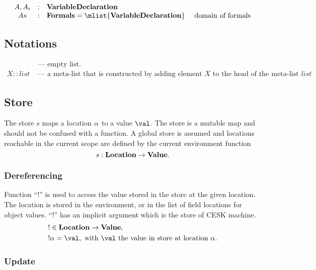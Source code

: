 \documentclass[a4paper,oneside]{article}
\begin{document}
\[
  \begin{array}{ccll}
    \formal, \formali{i} & : & \dvardecl\\
    \formals & : & \dformals = \mlist{\dvardecl} &\text{ domain of formals}\\

  \end{array}
\]


\subsection{Notations}
\label{subsec:notations}

\begin{align*}
    [] &\text{ --- empty list}.\\
    X :: list &\text{ --- a meta-list that is constructed by adding element $X$ to the head of the meta-list $list$}.
\end{align*}


\subsection{Store}
\label{subsec:store-definition}

The store $s$ maps a location $\alpha$ to a value $\val$.
The store is a mutable map and should not be confused with a function.
A global store is assumed and locations reachable in the current scope are defined by the current environment function
\[
    s : \mathbf{Location} \rightarrow \mathbf{Value}.
\]


\subsubsection{Dereferencing}
\label{subsubsection:dereferecing}

\newcommand{\deref}[1]{!#1}
Function ``$\deref{}$'' is used to access the value stored in the store at the given location.
The location is stored in the environment, or in the list of field locations for object values.
``$\deref{}$'' has an implicit argument which is the store of CESK machine.
\begin{align*}
    &\deref{} \in \dlocation \rightarrow \dval,\\
    &\deref{\loc} =  \val, \text{ with $\val$ the value in store at location } \loc.
\end{align*}


\subsubsection{Update}
\label{subsubsec:store-update}
\end{document}
